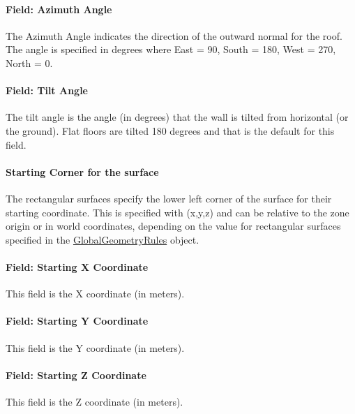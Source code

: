 \paragraph{Field: Azimuth Angle}\label{field-azimuth-angle-7}

The Azimuth Angle indicates the direction of the outward normal for the roof. The angle is specified in degrees where East = 90, South = 180, West = 270, North = 0.

\paragraph{Field: Tilt Angle}\label{field-tilt-angle-7}

The tilt angle is the angle (in degrees) that the wall is tilted from horizontal (or the ground). Flat floors are tilted 180 degrees and that is the default for this field.

\paragraph{Starting Corner for the surface}\label{starting-corner-for-the-surface-7}

The rectangular surfaces specify the lower left corner of the surface for their starting coordinate. This is specified with (x,y,z) and can be relative to the zone origin or in world coordinates, depending on the value for rectangular surfaces specified in the \hyperref[globalgeometryrules]{GlobalGeometryRules} object.

\paragraph{Field: Starting X Coordinate}\label{field-starting-x-coordinate-7}

This field is the X coordinate (in meters).

\paragraph{Field: Starting Y Coordinate}\label{field-starting-y-coordinate-7}

This field is the Y coordinate (in meters).

\paragraph{Field: Starting Z Coordinate}\label{field-starting-z-coordinate-7}

This field is the Z coordinate (in meters).

